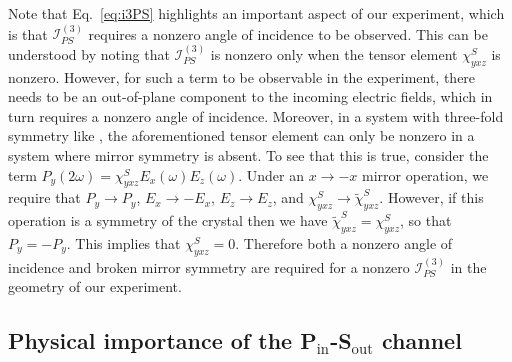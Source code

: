 
Note that Eq.~\ref{eq:i3PS} highlights an important aspect of our experiment, which is that $\mathscr{I}_{PS}^{(3)}$ requires a nonzero angle of incidence to be observed.
This can be understood by noting that $\mathscr{I}_{PS}^{(3)}$ is nonzero only when the tensor element $\chi^S_{yxz}$ is nonzero.
However, for such a term to be observable in the experiment, there needs to be an out-of-plane component to the incoming electric fields, which in turn requires a nonzero angle of incidence.
Moreover, in a system with three-fold symmetry like \tastwo, the aforementioned tensor element can only be nonzero in a system where mirror symmetry is absent.
To see that this is true, consider the term $P_y(2\omega)=\chi^S_{yxz}E_x(\omega)E_z(\omega)$.
Under an $x \rightarrow -x$ mirror operation, we require that $P_y \rightarrow P_y$, $E_x \rightarrow -E_x$, $E_z \rightarrow E_z$, and $\chi^S_{yxz} \rightarrow \widetilde{\chi}^S_{yxz}$.
However, if this operation is a symmetry of the crystal then we have $\widetilde{\chi}^S_{yxz} = \chi^S_{yxz}$, so that $P_y = -P_y$.
This implies that $\chi^S_{yxz} = 0$.
Therefore both a nonzero angle of incidence and broken mirror symmetry are required for a nonzero $\mathscr{I}_{PS}^{(3)}$ in the geometry of our experiment.

\subsection{Physical importance of the P$_\mathrm{in}$-S$_\mathrm{out}$ channel}

